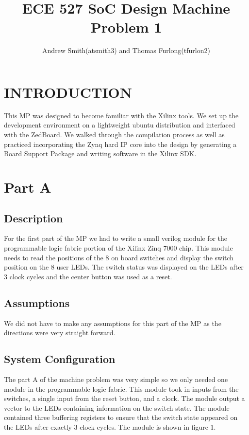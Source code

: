 \documentclass[letterpaper, 10 pt, conference]{IEEEconf}  %
\title{\LARGE \bf ECE 527 SoC Design Machine Problem 1}
\author{Andrew Smith(atsmith3) and Thomas Furlong(tfurlon2)}%
\begin{document}
\maketitle
\thispagestyle{empty}
\pagestyle{empty}


\section{INTRODUCTION}

This MP was designed to become familiar with the Xilinx tools. We set up the development environment on a lightweight ubuntu distribution and interfaced with the ZedBoard. We walked through the compilation process as well as practiced incorporating the Zynq hard IP core into the design by generating a Board Support Package and writing software in the Xilinx SDK.

\section{Part A}
\subsection{Description}
For the first part of the MP we had to write a small verilog module for the programmable logic fabric portion of the Xilinx Zinq 7000 chip. This module needs to read the positions of the 8 on board switches and display the switch position on the 8 user LEDs. The switch status was displayed on the LEDs after 3 clock cycles and the center button was used as a reset.

\subsection{Assumptions}
We did not have to make any assumptions for this part of the MP as the directions were very straight forward.

\subsection{System Configuration}
The part A of the machine problem was very simple so we only needed one module in the programmable logic fabric. This module took in inputs from the switches, a single input from the reset button, and a clock. The module output a vector to the LEDs containing information on the switch state. The module contained three buffering registers to ensure that the switch state appeared on the LEDs after exactly 3 clock cycles. The module is shown in figure 1.
\end{document}
